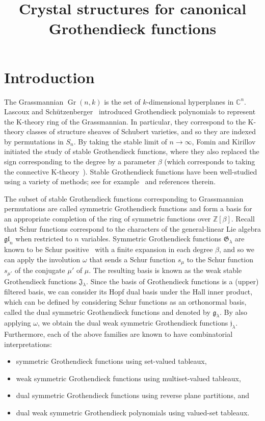 \documentclass[ALCO,ThmDefs,Unicode,epreuves]{cedram}
\author{\firstname{Graham} \lastname{Hawkes}}
\author{\firstname{Travis} \lastname{Scrimshaw}}
\title[Crystal structures for canonical Grothendiecks]
{Crystal structures for canonical Grothendieck functions}
\renewcommand{\G}{\mathfrak{G}}  %
\newcommand{\wG}{\mathfrak{J}}  %
\newcommand{\dG}{\mathfrak{g}}  %
\newcommand{\dwG}{\mathfrak{j}}  %
\newcommand{\gl}{\mathfrak{gl}}
\newcommand{\sym}{S}
\DeclareMathOperator{\Gr}{Gr} %
\newcommand{\ZZ}{\mathbb{Z}}
\newcommand{\CC}{\mathbb{C}}
\begin{document}
\maketitle

\section{Introduction}
\label{sec:introduction}

The Grassmannian $\Gr(n, k)$ is the set of $k$-dimensional hyperplanes in $\CC^n$. Lascoux and Sch{\"u}tzenberger~\cite{LS82,LS83} introduced Grothendieck polynomials to represent the K-theory ring of the Grassmannian. In particular, they correspond to the K-theory classes of structure sheaves of Schubert varieties, and so they are indexed by permutations in $\sym_n$. By taking the stable limit of $n \to \infty$, Fomin and Kirillov~\cite{FK94,FK96} initiated the study of stable Grothendieck functions, where they also replaced the sign corresponding to the degree by a parameter $\beta$ (which corresponds to taking the connective K-theory~\cite{Hudson}).
Stable Grothendieck functions have been well-studied using a variety of methods; see for example~\cite{BM12,Buch02,BKSTY08,BS16,GMPPRST16,IIM17,IN09,IS14,Iwao19,LamPyl07,Lenart00,Monical16,MPS18,MPS18II,MS13,MS14,
PP16,PS19,PS18,PY:genomic,PY18,TY09,WZJ16} and references therein.

The subset of stable Grothendieck functions corresponding to Grassmannian permutations are called symmetric Grothendieck functions and form a basis for an appropriate completion of the ring of symmetric functions over $\ZZ[\beta]$.
Recall that Schur functions correspond to the characters of the general-linear Lie algebra $\gl_n$ when restricted to $n$ variables.
Symmetric Grothendieck functions $\G_{\lambda}$ are known to be Schur positive~\cite{Lenart00} with a finite expansion in each degree $\beta$, and so we can apply the involution $\omega$ that sends a Schur function $s_{\mu}$ to the Schur function $s_{\mu'}$ of the conjugate $\mu'$ of $\mu$.
The resulting basis is known as the weak stable Grothendieck functions $\wG_{\lambda}$.
Since the basis of Grothendieck functions is a (upper) filtered basis, we can consider its Hopf dual basis under the Hall inner product, which can be defined by considering Schur functions as an orthonormal basis, called the dual symmetric Grothendieck functions and denoted by $\dG_{\lambda}$.
By also applying $\omega$, we obtain the dual weak symmetric Grothendieck functions $\dwG_{\lambda}$.
Furthermore, each of the above families are known to have combinatorial interpretations:
\begin{itemize}
\item symmetric Grothendieck functions using set-valued tableaux,
\item weak symmetric Grothendieck functions using multiset-valued tableaux,
\item dual symmetric Grothendieck functions using reverse plane partitions, and
\item dual weak symmetric Grothendieck polynomials using valued-set tableaux.
\end{itemize}
\end{document}
